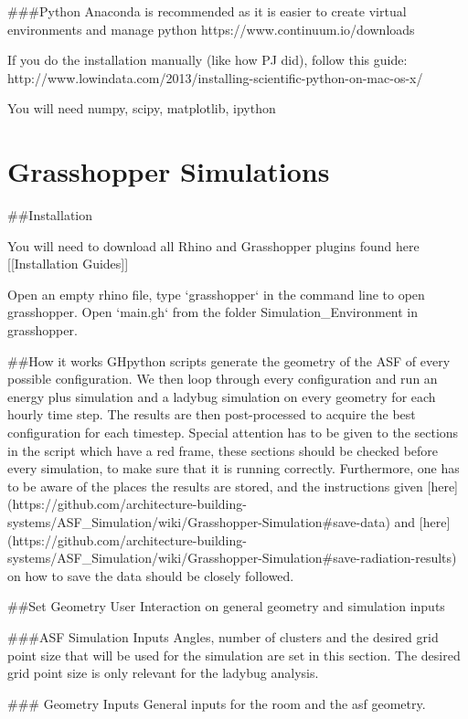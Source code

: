 	###Python
	Anaconda is recommended as it is easier to create virtual environments and manage python
	https://www.continuum.io/downloads

	If you do the installation manually (like how PJ did), follow this guide:
	http://www.lowindata.com/2013/installing-scientific-python-on-mac-os-x/

	You will need numpy, scipy, matplotlib, ipython


\section{Grasshopper Simulations}

	##Installation

	You will need to download all Rhino and Grasshopper plugins found here [[Installation Guides]]

	Open an empty rhino file, type `grasshopper` in the command line to open grasshopper. Open `main.gh` from the folder Simulation_Environment in grasshopper.



	##How it works
	GHpython scripts generate the geometry of the ASF of every possible configuration. We then loop through every configuration and run an energy plus simulation and a ladybug simulation on every geometry for each hourly time step. The results are then post-processed to acquire the best configuration for each timestep.
	Special attention has to be given to the sections in the script which have a red frame, these sections should be checked before every simulation, to make sure that it is running correctly. Furthermore, one has to be aware of the places the results are stored, and the instructions given [here](https://github.com/architecture-building-systems/ASF_Simulation/wiki/Grasshopper-Simulation#save-data) and [here](https://github.com/architecture-building-systems/ASF_Simulation/wiki/Grasshopper-Simulation#save-radiation-results) on how to save the data should be closely followed. 



	##Set Geometry
	User Interaction on general geometry and simulation inputs

	###ASF Simulation Inputs
	Angles, number of clusters and the desired grid point size that will be used for the simulation are set in this section. The desired grid point size is only relevant for the ladybug analysis.

	### Geometry Inputs
	General inputs for the room and the asf geometry. 

